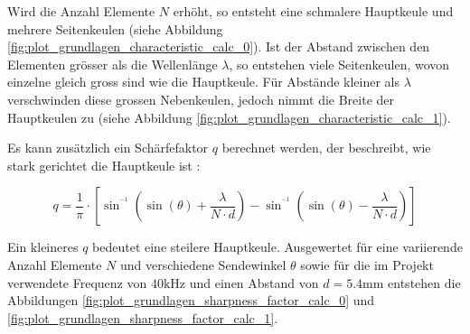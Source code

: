 Wird die Anzahl Elemente $N$ erhöht, so entsteht eine schmalere Hauptkeule und mehrere Seitenkeulen (siehe Abbildung \ref{fig:plot_grundlagen_characteristic_calc_0}). Ist der Abstand zwischen den Elementen grösser als die Wellenlänge $\lambda$, so entstehen viele Seitenkeulen, wovon einzelne gleich gross sind wie die Hauptkeule. Für Abstände kleiner als $\lambda$ verschwinden diese grossen Nebenkeulen, jedoch nimmt die Breite der Hauptkeulen zu (siehe Abbildung \ref{fig:plot_grundlagen_characteristic_calc_1}).

Es kann zusätzlich ein Schärfefaktor $q$ berechnet werden, der beschreibt, wie stark gerichtet die Hauptkeule ist \cite{WOOH}:

\begin{equation}
q = \frac{1}{\pi} \cdot \left [  \sin^{^{-1}}(\sin(\theta)+\frac{\lambda}{N \cdot d})-\sin^{^{-1}}(\sin(\theta)-\frac{\lambda}{N \cdot d}) \right ]
\label{eq:schaerfefaktor}
\end{equation}

Ein kleineres $q$ bedeutet eine steilere Hauptkeule. Ausgewertet für eine variierende Anzahl Elemente $N$ und verschiedene Sendewinkel $\theta$ sowie für die im Projekt verwendete Frequenz von $40 \mathrm{kHz}$ und einen Abstand von $d = 5.4 \mathrm{mm}$ entstehen die Abbildungen \ref{fig:plot_grundlagen_sharpness_factor_calc_0} und \ref{fig:plot_grundlagen_sharpness_factor_calc_1}.

